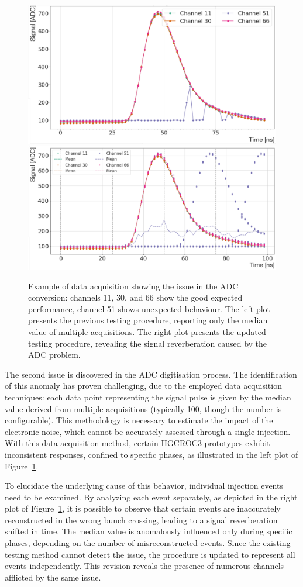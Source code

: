 \begin{figure}
    \centering
    \includegraphics[height=0.25\linewidth]{Figures/HGCAL/ADCIssue_Median.pdf}
    \includegraphics[height=0.25\linewidth]{Figures/HGCAL/ADCIssue_Raw.pdf}
    \caption{Example of data acquisition showing the issue in the ADC conversion: channels 11, 30, and 66 show the good expected performance, channel 51 shows unexpected behaviour. The left plot presents the previous testing procedure, reporting only the median value of multiple acquisitions. The right plot presents the updated testing procedure, revealing the signal reverberation caused by the ADC problem.}
    \label{fig:ADCIssue}
\end{figure}

The second issue is discovered in the ADC digitisation process. The identification of this anomaly has proven challenging, due to the employed data acquisition techniques: each data point representing the signal pulse is given by the median value derived from multiple acquisitions (typically 100, though the number is configurable). This methodology is necessary to estimate the impact of the electronic noise, which cannot be accurately assessed through a single injection.
With this data acquisition method, certain HGCROC3 prototypes exhibit inconsistent responses, confined to specific phases, as illustrated in the left plot of Figure~\ref{fig:ADCIssue}.

To elucidate the underlying cause of this behavior, individual injection events need to be examined. By analyzing each event separately, as depicted in the right plot of Figure~\ref{fig:ADCIssue}, it is possible to observe that certain events are inaccurately reconstructed in the wrong bunch crossing, leading to a signal reverberation shifted in time. The median value is anomalously influenced only during specific phases, depending on the number of misreconstructed events.
Since the existing testing method cannot detect the issue, the procedure is updated to represent all events independently. This revision reveals the presence of numerous channels afflicted by the same issue.

